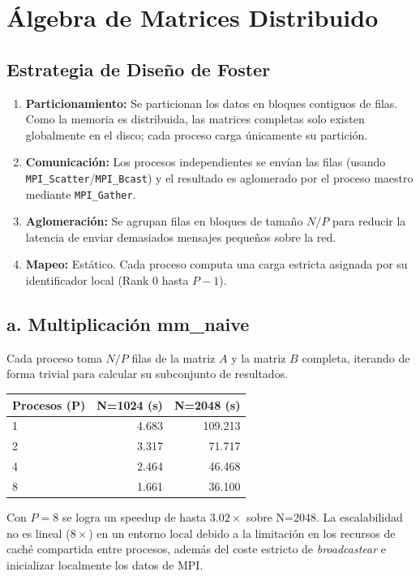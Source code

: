 \documentclass[11pt,a4paper]{article}
\begin{document}
\section{Álgebra de Matrices Distribuido}

\subsection*{Estrategia de Diseño de Foster}
\begin{enumerate}
    \item \textbf{Particionamiento:} Se particionan los datos en bloques contiguos de filas. Como la memoria es distribuida, las matrices completas solo existen globalmente en el disco; cada proceso carga únicamente su partición.
    \item \textbf{Comunicación:} Los procesos independientes se envían las filas (usando \texttt{MPI\_Scatter}/\texttt{MPI\_Bcast}) y el resultado es aglomerado por el proceso maestro mediante \texttt{MPI\_Gather}. 
    \item \textbf{Aglomeración:} Se agrupan filas en bloques de tamaño $N/P$ para reducir la latencia de enviar demasiados mensajes pequeños sobre la red.
    \item \textbf{Mapeo:} Estático. Cada proceso computa una carga estricta asignada por su identificador local (Rank $0$ hasta $P-1$).
\end{enumerate}

\subsection*{a. Multiplicación mm\_naive}

Cada proceso toma $N/P$ filas de la matriz $A$ y la matriz $B$ completa, iterando de forma trivial para calcular su subconjunto de resultados.

\begin{center}
\begin{tabular}{|l|r|r|}
\hline
\textbf{Procesos (P)} & \textbf{N=1024 (s)} & \textbf{N=2048 (s)} \\
\hline
1 & 4.683 & 109.213 \\
2 & 3.317 & 71.717 \\
4 & 2.464 & 46.468 \\
8 & 1.661 & 36.100 \\
\hline
\end{tabular}
\end{center}
Con $P=8$ se logra un speedup de hasta $3.02\times$ sobre N=2048. La escalabilidad no es lineal ($8\times$) en un entorno local debido a la limitación en los recursos de caché compartida entre procesos, además del coste estricto de \emph{broadcastear} e inicializar localmente los datos de MPI.
\end{document}
